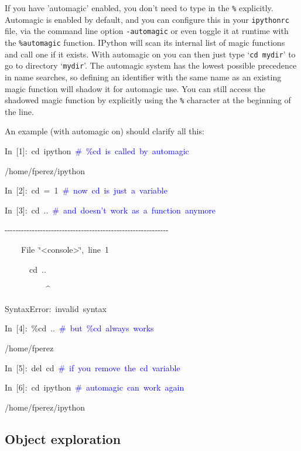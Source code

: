 If you have 'automagic' enabled, you don't need to type in the \texttt{\%}
explicitly. Automagic is enabled by default, and you can configure
this in your \texttt{ipythonrc} file, via the command line option
\texttt{-automagic} or even toggle it at runtime with the \texttt{\%automagic}
function. IPython will scan its internal list of magic functions and
call one if it exists. With automagic on you can then just type `\texttt{cd
mydir}' to go to directory `\texttt{mydir}'. The automagic system
has the lowest possible precedence in name searches, so defining an
identifier with the same name as an existing magic function will shadow
it for automagic use. You can still access the shadowed magic function
by explicitly using the \texttt{\%} character at the beginning of
the line.

An example (with automagic on) should clarify all this:

\begin{lyxcode}
In~{[}1]:~cd~ipython~\textcolor{blue}{\#~\%cd~is~called~by~automagic}

/home/fperez/ipython

In~{[}2]:~cd~=~1~\textcolor{blue}{\#~now~cd~is~just~a~variable}

In~{[}3]:~cd~..~\textcolor{blue}{\#~and~doesn't~work~as~a~function~anymore}

-{}-{}-{}-{}-{}-{}-{}-{}-{}-{}-{}-{}-{}-{}-{}-{}-{}-{}-{}-{}-{}-{}-{}-{}-{}-{}-{}-{}-{}-{}-{}-{}-{}-{}-{}-{}-{}-{}-{}-{}-{}-{}-{}-{}-{}-{}-{}-{}-{}-{}-{}-{}-{}-{}-{}-{}-{}-{}-{}-

~~~~File~\char`\"{}<console>\char`\"{},~line~1

~~~~~~cd~..

~~~~~~~~~~\textasciicircum{}

SyntaxError:~invalid~syntax



In~{[}4]:~\%cd~..~\textcolor{blue}{\#~but~\%cd~always~works}

/home/fperez

In~{[}5]:~del~cd~\textcolor{blue}{\#~if~you~remove~the~cd~variable}

In~{[}6]:~cd~ipython~\textcolor{blue}{\#~automagic~can~work~again}

/home/fperez/ipython
\end{lyxcode}

\subsection{Object exploration}

